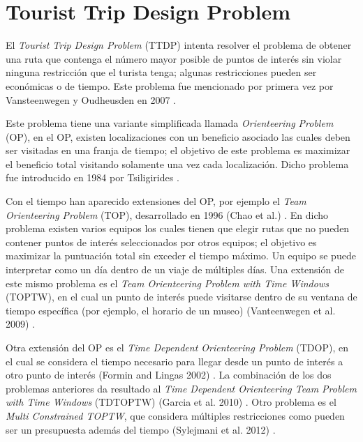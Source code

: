 \section[Tourist Trip Design Problem]{Tourist Trip Design Problem}
El \textit{Tourist Trip Design Problem} (TTDP) intenta resolver el problema de obtener una ruta que contenga el número mayor posible de puntos de interés sin violar ninguna restricción que el turista tenga; algunas restricciones pueden ser económicas o de tiempo. Este problema fue mencionado por primera vez por Vansteenwegen y Oudheusden en 2007 \cite{first_article_TTDP}.\newline

Este problema tiene una variante simplificada llamada \textit{Orienteering Problem} (OP), en el OP, existen localizaciones con un beneficio asociado las cuales deben ser visitadas en una franja de tiempo; el objetivo de este problema es maximizar el beneficio total visitando solamente una vez cada localización. Dicho problema fue introducido en 1984 por Tsiligirides \cite{first_article_OP}.\newline

Con el tiempo han aparecido extensiones del OP, por ejemplo el \textit{Team Orienteering Problem} (TOP), desarrollado en 1996 (Chao et al.) \cite{Chao}. En dicho problema existen varios equipos los cuales tienen que elegir rutas que no pueden contener puntos de interés seleccionados por otros equipos; el objetivo es maximizar la puntuación total sin exceder el tiempo máximo. Un equipo se puede interpretar como un día dentro de un viaje de múltiples días. Una extensión de este mismo problema es el \textit{Team Orienteering Problem with Time Windows} (TOPTW), en el cual un punto de interés puede visitarse  dentro de su ventana de tiempo específica (por ejemplo, el horario de un museo) (Vanteenwegen et al. 2009) \cite{TOPTW}.\newline

Otra extensión del OP es el \textit{Time Dependent Orienteering Problem} (TDOP), en el cual se considera el tiempo necesario para llegar desde un punto de interés a otro punto de interés (Formin and Lingas 2002) \cite{TDOP}. La combinación de los dos problemas anteriores da resultado al \textit{Time Dependent Orienteering Team Problem with Time Windows} (TDTOPTW) (Garcia et al. 2010) \cite{TDTOPTW}. Otro problema es el \textit{Multi Constrained TOPTW}, que considera múltiples restricciones como pueden ser un presupuesta además del tiempo (Sylejmani et al. 2012) \cite{multiconstrained_toptw}.\newline


